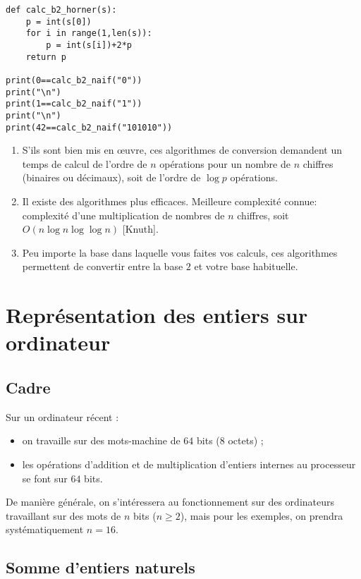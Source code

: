 \begin{lstlisting}
def calc_b2_horner(s):
    p = int(s[0])
    for i in range(1,len(s)):
        p = int(s[i])+2*p
    return p
    
print(0==calc_b2_naif("0"))
print("\n")
print(1==calc_b2_naif("1"))
print("\n")
print(42==calc_b2_naif("101010"))
\end{lstlisting}


\begin{rem}
\begin{enumerate}
\item S'ils sont bien mis en œuvre, ces algorithmes de conversion demandent
un temps de calcul de l'ordre de $n$ opérations pour un nombre de $n$ chiffres
(binaires ou décimaux), soit de l'ordre de $\log p$ opérations.
\item Il existe des algorithmes plus efficaces. Meilleure complexité
  connue: complexité d'une multiplication de nombres de $n$ chiffres,
  soit $O(n\log n \log \log n)$ [Knuth].
\item Peu importe la base dans laquelle vous faites vos calculs, ces
  algorithmes permettent de convertir entre la base $2$ et votre base
  habituelle. 
\end{enumerate}
\end{rem}

\section{Représentation des entiers sur ordinateur}
\subsection{Cadre}
Sur un ordinateur récent :
\begin{itemize}
\item[\textbullet] on travaille sur des mots-machine de $64$ bits ($8$ octets) ;
\item[\textbullet] les opérations d'addition et de multiplication d'entiers internes au
  processeur se font sur $64$ bits.
\end{itemize}

De manière générale, on s'intéressera au fonctionnement sur des
ordinateurs travaillant sur des mots de $n$ bits ($n\geq 2$), mais pour les
exemples, on prendra systématiquement $n=16$.

\subsection{Somme d'entiers naturels}
\sloppy

